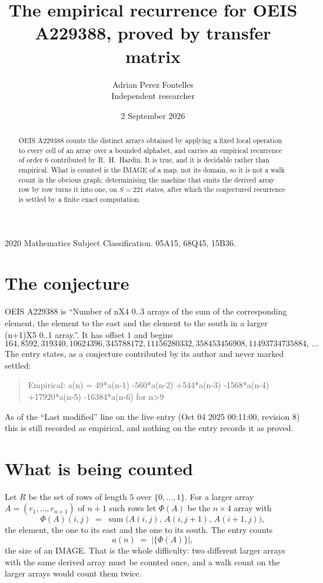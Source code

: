 \documentclass[11pt,a4paper]{article}
\title{The empirical recurrence for OEIS A229388, proved by transfer matrix}
\author{Adrian Perez Fontelles\\ \small Independent researcher}
\date{2 September 2026}
\theoremstyle{plain}
\theoremstyle{definition}
\begin{document}
\maketitle

\begin{abstract}
OEIS A229388 counts the distinct arrays obtained by applying a fixed local operation to every cell
of an array over a bounded alphabet, and carries an empirical recurrence of order $6$
contributed by R.~H.~Hardin. It is true, and it is decidable rather than empirical. What is
counted is the IMAGE of a map, not its domain, so it is not a walk count in the obvious graph;
determinising the machine that emits the derived array row by row turns it into one, on
$S=221$ states, after which the conjectured recurrence is settled by a finite exact
computation.
\end{abstract}

\noindent\small 2020 Mathematics Subject Classification. 05A15, 68Q45, 15B36.\normalsize

\section{The conjecture}

OEIS A229388 is ``Number of nX4 0..3 arrays of the sum of the corresponding element, the element to the east and the element to the south in a larger (n+1)X5 0..1 array.''. It has offset $1$ and begins
\[
164, 8592, 319340, 10624396, 345788172, 11156280332, 358453456908, 11493734735884,\ \dots
\]
The entry states, as a conjecture contributed by its author and never marked settled:
\begin{quote}
Empirical: a(n) = 49*a(n-1) -560*a(n-2) +544*a(n-3) -1568*a(n-4) +17920*a(n-5) -16384*a(n-6) for n>9
\end{quote}
As of the ``Last modified'' line on the live entry (Oct 04 2025 00:11:00, revision 8) this is still
recorded as empirical, and nothing on the entry records it as proved.

\section{What is being counted}

Let $R$ be the set of rows of length $5$ over $\{0,\dots,1\}$.
For a larger array $A=(r_1,\dots,r_{n+1})$ of $n+1$ such rows let $\Phi(A)$ be the
$n\times4$ array with
\[
\Phi(A)(i,j)\;=\;\operatorname{sum}\bigl(A(i,j),\,A(i,j+1),\,A(i+1,j)\bigr),
\]
the element, the one to its east and the one to its south. The entry counts
\[
a(n)\;=\;\bigl|\{\Phi(A)\}\bigr| ,
\]
the size of an IMAGE. That is the whole difficulty: two different larger arrays with the same
derived array must be counted once, and a walk count on the larger arrays would count them
twice.
\end{document}
